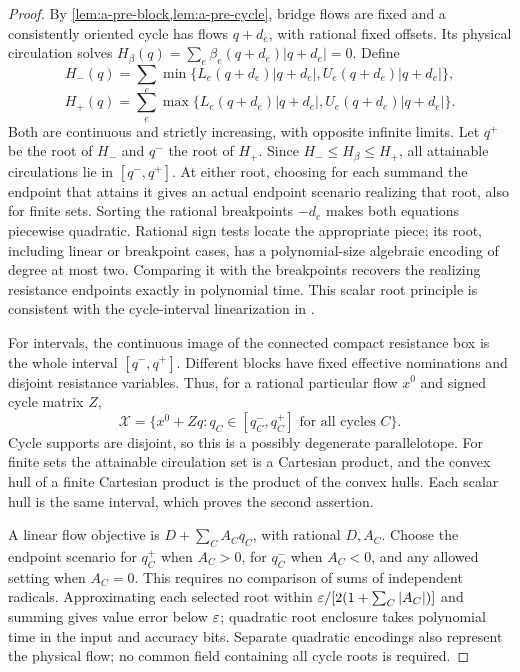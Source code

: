 \begin{proof}
By \cref{lem:a-pre-block,lem:a-pre-cycle}, bridge flows are fixed and a
consistently oriented cycle has flows $q+d_e$, with rational fixed offsets.
Its physical circulation solves
$H_\beta(q)=\sum_e\beta_e(q+d_e)|q+d_e|=0$.
Define
\[
 H_-(q)=\sum_e\min\{L_e(q+d_e)|q+d_e|,U_e(q+d_e)|q+d_e|\},
\]
\[
 H_+(q)=\sum_e\max\{L_e(q+d_e)|q+d_e|,U_e(q+d_e)|q+d_e|\}.
\]
Both are continuous and strictly increasing, with opposite infinite
limits. Let $q^+$ be the root of $H_-$ and $q^-$ the root of $H_+$.
Since $H_-\le H_\beta\le H_+$, all attainable circulations lie in
$[q^-,q^+]$. At either root, choosing for each summand the endpoint that
attains it gives an actual endpoint scenario realizing that root, also
for finite sets. Sorting the rational breakpoints $-d_e$ makes both
equations piecewise quadratic. Rational sign tests locate the appropriate
piece; its root, including linear or breakpoint cases, has a polynomial-size
algebraic encoding of degree at most two. Comparing it with the
breakpoints recovers the realizing resistance endpoints exactly in
polynomial time. This scalar root principle is consistent with the
cycle-interval linearization in
\citet[Lemma 4.10]{amann2018-deciding-robust-feasibility-and-infeasibility}.

For intervals, the continuous image of the connected compact resistance
box is the whole interval $[q^-,q^+]$. Different blocks have fixed
effective nominations and disjoint resistance variables. Thus, for a
rational particular flow $x^0$ and signed cycle matrix $Z$,
\begin{equation}
 \mathcal X=\{x^0+Zq:q_C\in[q_C^-,q_C^+]\text{ for all cycles }C\}.
 \label{eq:a-weight-flow-box}
\end{equation}
Cycle supports are disjoint, so this is a possibly degenerate
parallelotope. For finite sets the attainable circulation set is a
Cartesian product, and the convex hull of a finite Cartesian product is
the product of the convex hulls. Each scalar hull is the same interval,
which proves the second assertion.

A linear flow objective is $D+\sum_C A_Cq_C$, with rational $D,A_C$.
Choose the endpoint scenario for $q_C^+$ when $A_C>0$, for $q_C^-$ when
$A_C<0$, and any allowed setting when $A_C=0$. This requires no comparison
of sums of independent radicals. Approximating each selected root within
$\varepsilon/[2(1+\sum_C|A_C|)]$ and summing gives value error below $\varepsilon$;
quadratic root enclosure takes polynomial time in the input and accuracy
bits. Separate quadratic encodings also represent the physical flow;
no common field containing all cycle roots is required.


\end{proof}
